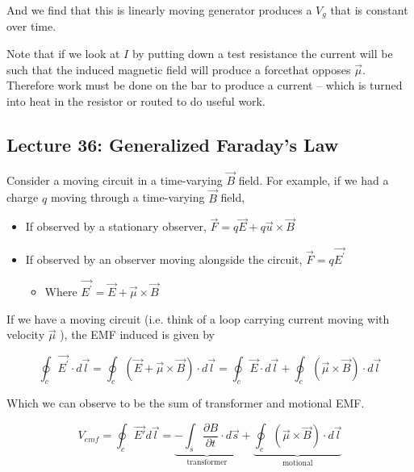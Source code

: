 \documentclass[10pt]{article}
\begin{document}
And we find that this is linearly moving generator produces a $ V_g $ that is constant over time.

Note that if we look at $ I $ by putting down a test resistance the current will be such that the induced magnetic field will produce a forcethat opposes $ \vec{\mu} $.
Therefore work must be done on the bar to produce a current -- which is turned into heat in the resistor or routed to do useful work.





\subsection{Lecture 36: Generalized Faraday's Law}

Consider a moving circuit in a time-varying $ \vec{B} $ field.
For example, if we had a charge $ q $ moving through a time-varying $ \vec{B}$ field,

\begin{itemize}
	\item If observed by a stationary observer, $ \vec{F} = q\vec{E} + q \vec{u} \times  \vec{B} $ 
	\item If observed by an observer moving alongside the circuit, $ \vec{F} = q \vec{E^\prime} $
		\begin{itemize}
			\item Where $ \vec{E^\prime} = \vec{E} + \vec{\mu} \times  \vec{B}$ 
		\end{itemize}
\end{itemize}


If we have a moving circuit (i.e. think of a loop carrying current moving with velocity $ \vec{\mu} $ ), the EMF induced is given by

\begin{equation}
	\oint_c \vec{E^\prime} \cdot  d \vec{l} = \oint_c (\vec{E} + \vec{\mu} \times  \vec{B}) \cdot  d \vec{l} = \oint_c  \vec{E} \cdot  d \vec{l} + \oint_c (\vec{\mu} \times \vec{B}) \cdot d \vec{l}
\end{equation}

Which we can observe to be the sum of transformer and motional EMF.

\begin{equation}
	V_{emf} = \oint_c \vec{E'} d \vec{l} = 
	\underbrace{-\int_s \frac{\partial B}{\partial t} \cdot  d \vec{s}}
	_{\text{transformer}}
	+ 
	\underbrace{\oint_c (\vec{\mu} \times  \vec{B}) \cdot  d \vec{l}}
	_{\text{motional}}
	\label{eq:259:generalized_faraday}
\end{equation}
\end{document}
